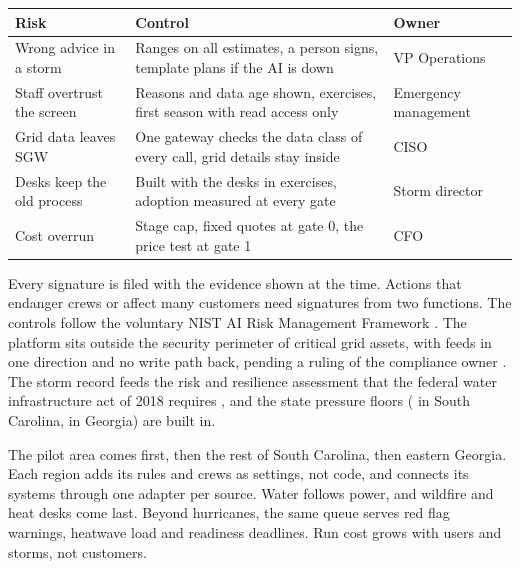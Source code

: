 \documentclass[fontsize=10pt,a4paper,DIV=12,parskip=half-,numbers=noenddot,headsepline,captions=tableheading]{scrartcl}
\begin{document}
\par\noindent\begin{minipage}{\linewidth}\centering\footnotesize
  \label{tab:risks}
  \begin{tabularx}{\textwidth}{@{}L{3.2cm} Y L{3.0cm}@{}}
    \toprule
    \textbf{Risk} & \textbf{Control} & \textbf{Owner} \\ \midrule
    Wrong advice in a storm & Ranges on all estimates, a person signs, template plans if the AI is down & VP Operations \\ \lightrowrule
    Staff overtrust the screen & Reasons and data age shown, exercises, first season with read access only & Emergency management \\ \lightrowrule
    Grid data leaves SGW & One gateway checks the data class of every call, grid details stay inside & CISO \\ \lightrowrule
    Desks keep the old process & Built with the desks in exercises, adoption measured at every gate & Storm director \\ \lightrowrule
    Cost overrun & Stage cap, fixed quotes at gate 0, the price test at gate 1 & CFO \\ \bottomrule
  \end{tabularx}
\end{minipage}\par

Every signature is filed with the evidence shown at the time. Actions that endanger crews or affect many customers need signatures from two functions. The controls follow the voluntary NIST AI Risk Management Framework \citep{nist2023airmf}. The platform sits outside the security perimeter of critical grid assets, with feeds in one direction and no write path back, pending a ruling of the compliance owner \citep{nerc_cip}. The storm record feeds the risk and resilience assessment that the federal water infrastructure act of 2018 requires \citep{epa_awia_2013}, and the state pressure floors ( in South Carolina,  in Georgia) are built in.

The pilot area comes first, then the rest of South Carolina, then eastern Georgia. Each region adds its rules and crews as settings, not code, and connects its systems through one adapter per source. Water follows power, and wildfire and heat desks come last. Beyond hurricanes, the same queue serves red flag warnings, heatwave load and readiness deadlines. Run cost grows with users and storms, not customers.
\clearpage
{}
{\footnotesize}
\end{document}
